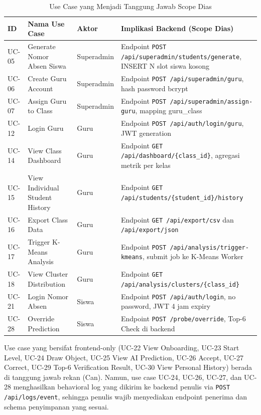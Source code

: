 \documentclass[12pt,a4paper,oneside,openany]{report}
\begin{document}
\begin{table}[H]
\centering
\caption{Use Case yang Menjadi Tanggung Jawab Scope Dias}
\label{tab:use-case-dias-focus}
\begin{tabular}{|p{1cm}|p{4cm}|p{2.5cm}|p{6cm}|}
\hline
\textbf{ID} & \textbf{Nama Use Case} & \textbf{Aktor} & \textbf{Implikasi Backend (Scope Dias)} \\ \hline
UC-05 & Generate Nomor Absen Siswa & Superadmin & Endpoint \texttt{POST /api/superadmin/students/generate}, INSERT N slot siswa kosong \\ \hline
UC-06 & Create Guru Account & Superadmin & Endpoint \texttt{POST /api/superadmin/guru}, hash password bcrypt \\ \hline
UC-07 & Assign Guru to Class & Superadmin & Endpoint \texttt{POST /api/superadmin/assign-guru}, mapping guru\_class \\ \hline
UC-12 & Login Guru & Guru & Endpoint \texttt{POST /api/auth/login/guru}, JWT generation \\ \hline
UC-14 & View Class Dashboard & Guru & Endpoint \texttt{GET /api/dashboard/\{class\_id\}}, agregasi metrik per kelas \\ \hline
UC-15 & View Individual Student History & Guru & Endpoint \texttt{GET /api/students/\{student\_id\}/history} \\ \hline
UC-16 & Export Class Data & Guru & Endpoint \texttt{GET /api/export/csv} dan \texttt{/api/export/json} \\ \hline
UC-17 & Trigger K-Means Analysis & Guru & Endpoint \texttt{POST /api/analysis/trigger-kmeans}, submit job ke K-Means Worker \\ \hline
UC-18 & View Cluster Distribution & Guru & Endpoint \texttt{GET /api/analysis/clusters/\{class\_id\}} \\ \hline
UC-21 & Login Nomor Absen & Siswa & Endpoint \texttt{POST /api/auth/login}, no password, JWT 4 jam expiry \\ \hline
UC-28 & Override Prediction & Siswa & Endpoint \texttt{POST /probe/override}, Top-6 Check di backend \\ \hline
\end{tabular}
\end{table}

Use case yang bersifat frontend-only (UC-22 View Onboarding, UC-23 Start Level, UC-24 Draw Object, UC-25 View AI Prediction, UC-26 Accept, UC-27 Correct, UC-29 Top-6 Verification Result, UC-30 View Personal History) berada di tanggung jawab rekan (Can). Namun, use case UC-24, UC-26, UC-27, dan UC-28 menghasilkan behavioral log yang dikirim ke backend penulis via \texttt{POST /api/logs/event}, sehingga penulis wajib menyediakan endpoint penerima dan schema penyimpanan yang sesuai.
\end{document}
